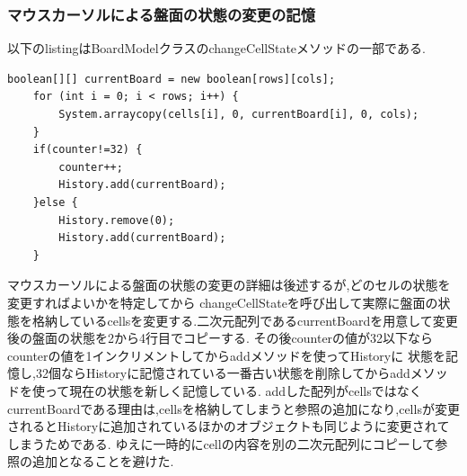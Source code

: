 \documentclass[dvipdfmx]{jarticle}
\begin{document}
\subsubsection{マウスカーソルによる盤面の状態の変更の記憶}
以下のlistingはBoardModelクラスのchangeCellStateメソッドの一部である.
\begin{lstlisting}[caption=changeCellStateメソッドの一部,label=fuga]
    boolean[][] currentBoard = new boolean[rows][cols];
    for (int i = 0; i < rows; i++) {
        System.arraycopy(cells[i], 0, currentBoard[i], 0, cols);
    }
    if(counter!=32) {
        counter++;
        History.add(currentBoard);
    }else {
        History.remove(0);
        History.add(currentBoard);
    }
\end{lstlisting}
マウスカーソルによる盤面の状態の変更の詳細は後述するが,どのセルの状態を変更すればよいかを特定してから
changeCellStateを呼び出して実際に盤面の状態を格納しているcellsを変更する.二次元配列であるcurrentBoardを用意して変更後の盤面の状態を2から4行目でコピーする.
その後counterの値が32以下ならcounterの値を1インクリメントしてからaddメソッドを使ってHistoryに
状態を記憶し,32個ならHistoryに記憶されている一番古い状態を削除してからaddメソッドを使って現在の状態を新しく記憶している.
addした配列がcellsではなくcurrentBoardである理由は,cellsを格納してしまうと参照の追加になり,cellsが変更されるとHistoryに追加されているほかのオブジェクトも同じように変更されてしまうためである.
ゆえに一時的にcellの内容を別の二次元配列にコピーして参照の追加となることを避けた.
\end{document}
